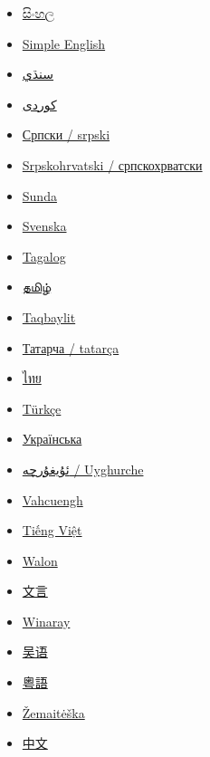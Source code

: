 \documentclass[11pt,a4paper]{article}
\begin{document}
\begin{itemize}
\item \href{https://si.wikipedia.org/wiki/\%E0\%B6\%AD\%E0\%B7\%8F\%E0\%B6\%BB\%E0\%B7\%8F\%E0\%B7\%80\%E0\%B7\%8F}{සිංහල}
\item \href{https://simple.wikipedia.org/wiki/Duck}{Simple English}
\item \href{https://sd.wikipedia.org/wiki/\%D8\%A8\%D8\%AF\%DA\%AA}{سنڌي}
\item \href{https://ckb.wikipedia.org/wiki/\%D9\%85\%D8\%B1\%D8\%A7\%D9\%88\%DB\%8C}{کوردی}
\item \href{https://sr.wikipedia.org/wiki/\%D0\%9F\%D0\%B0\%D1\%82\%D0\%BA\%D0\%B0}{Српски / srpski}
\item \href{https://sh.wikipedia.org/wiki/Patka}{Srpskohrvatski / српскохрватски}
\item \href{https://su.wikipedia.org/wiki/Meri}{Sunda}
\item \href{https://sv.wikipedia.org/wiki/Egentliga\_andf\%C3\%A5glar}{Svenska}
\item \href{https://tl.wikipedia.org/wiki/Bibi}{Tagalog}
\item \href{https://ta.wikipedia.org/wiki/\%E0\%AE\%B5\%E0\%AE\%BE\%E0\%AE\%A4\%E0\%AF\%8D\%E0\%AE\%A4\%E0\%AF\%81}{தமிழ்}
\item \href{https://kab.wikipedia.org/wiki/Ab\%E1\%B9\%9Bik}{Taqbaylit}
\item \href{https://tt.wikipedia.org/wiki/\%D2\%AE\%D1\%80\%D0\%B4\%D3\%99\%D0\%BA\%D0\%BB\%D3\%99\%D1\%80}{Татарча / tatarça}
\item \href{https://th.wikipedia.org/wiki/\%E0\%B9\%80\%E0\%B8\%9B\%E0\%B9\%87\%E0\%B8\%94}{ไทย}
\item \href{https://tr.wikipedia.org/wiki/\%C3\%96rdek}{Türkçe}
\item \href{https://uk.wikipedia.org/wiki/\%D0\%9A\%D0\%B0\%D1\%87\%D0\%BA\%D0\%B8}{Українська}
\item \href{https://ug.wikipedia.org/wiki/\%D8\%A6\%DB\%86\%D8\%B1\%D8\%AF\%DB\%95\%D9\%83}{ئۇيغۇرچە / Uyghurche}
\item \href{https://za.wikipedia.org/wiki/Bit\_(doenghduz)}{Vahcuengh}
\item \href{https://vi.wikipedia.org/wiki/V\%E1\%BB\%8Bt}{Tiếng Việt}
\item \href{https://wa.wikipedia.org/wiki/Can\%C3\%A5rd}{Walon}
\item \href{https://zh-classical.wikipedia.org/wiki/\%E9\%B4\%A8}{文言}
\item \href{https://war.wikipedia.org/wiki/Pato}{Winaray}
\item \href{https://wuu.wikipedia.org/wiki/\%E9\%B8\%AD}{吴语}
\item \href{https://zh-yue.wikipedia.org/wiki/\%E9\%B4\%A8}{粵語}
\item \href{https://bat-smg.wikipedia.org/wiki/P\%C4\%ABl\%C4\%97}{Žemaitėška}
\item \href{https://zh.wikipedia.org/wiki/\%E9\%B8\%AD}{中文}
\end{itemize}
\end{document}
